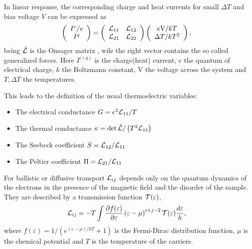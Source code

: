 In linear response, the corresponding charge and heat currents for small  $\Delta T$ and bias voltage $V$
 can be expressed as \cite{benenti2017fundamental}
\begin{equation}
\label{eq:thermoLinearMatrix}
    \left(
        \begin{array}{c}
            I^c/e \\
            I^q 
        \end{array}
    \right)  
    =  
    \left(
        \begin{array}{cc}
             \mathcal{L}_{ 11 }    &    \mathcal{L}_{ 12 }   \\
             \mathcal{L}_{ 21 }    &    \mathcal{L}_{ 22 }  
        \end{array}
    \right) 
    \left(
        \begin{array}{c}
            e \text{V} / k T\\
            \Delta T / k T^2
        \end{array}
    \right),
\end{equation}
%
being $\hat{\cal L}$ is the Onsager matrix \cite{onsager1931reciprocal, onsager1931reciprocalII}, wile the right vector contains the so called generalized forces. Here $I^{c(q)}$ is the charge(heat) current, $e$ the quantum of electrical charge, $k$ the Boltzmann constant, V the voltage across the system and $T, \Delta T$ the temperatures. 

This leads to the definition of the usual thermoelectric variables:
\begin{itemize}
  \item The electrical conductance $G=e^2  \mathcal{L}_{ 11 } /T$
  \item The thermal conductance $\kappa= \det{\hat{\cal L}}/\left(T^2  \mathcal{L}_{ 11 }  \right)$
  \item The Seebeck coefficient $S  =  \mathcal{L}_{ 12 } /  \mathcal{L}_{ 11 } $
  \item The Peltier coefficient $\Pi=  \mathcal{L}_{ 21 } /  \mathcal{L}_{ 11 } $
\end{itemize}

For ballistic or diffusive transport  ${\cal L}_{ij}$ depends only on the quantum dynamics of the electrons in the presence of the magnetic field and the disorder of the sample. They are  described by a transmission function $\mathcal{T} (\varepsilon)$,
%
\begin{equation}
  \label{eq:teo:onsaCoef}
   \mathcal{L}_{ ij } = - T \int  \frac{\partial f (\varepsilon)}{\partial \varepsilon} \left(\varepsilon-\mu \right)^{i+j-2} {\cal T}(\varepsilon) \frac{d\varepsilon}{h},
\end{equation}
%
where  $f(\varepsilon)=1/(e^{(\varepsilon-\mu)/k T}+1)$ is the Fermi-Dirac distribution function, $\mu$ is the chemical potential and $T$ is the temperature of the carriers. 

